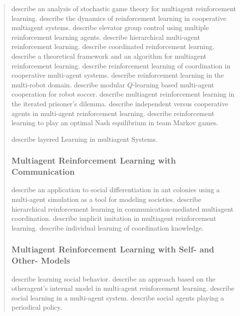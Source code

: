 \begin{quotation}
\cite{bowling2000asg} describe an analysis of stochastic game theory for multiagent reinforcement learning.
\cite{claus1998drl} describe the dynamics of reinforcement learning in cooperative multiagent systems.
\cite{crites1998egc} describe elevator group control using multiple reinforcement learning agents.
\cite{ghavamzadeh2006hma} describe hierarchical multi-agent reinforcement learning.
\cite{guestrin2002crl} describe coordinated reinforcement learning.
\cite{hu1998mrl} describe a theoretical framework and an algorithm for multiagent reinforcement learning.
\cite{kapetanakis2002rlc} describe reinforcement learning of coordination in cooperative multi-agent systems.
\cite{mataric1997rlm} describe reinforcement learning in the multi-robot domain.
\cite{park2001mql} describe modular $Q$-learning based multi-agent cooperation for robot soccer.
\cite{sandholm1996mrl} describe multiagent reinforcement learning in the iterated prisoner's dilemma.
\cite{tan1997mar} describe independent versus cooperative agents in multi-agent reinforcement learning.
\cite{wang2003rlp} describe reinforcement learning to play an optimal Nash equilibrium in team Markov games.

\cite{stone1997llm} describe layered Learning in multiagent Systems.

\subsubsection{Multiagent Reinforcement Learning with Communication}

\cite{drogoul1994mas} describe an application to social differentiation in ant colonies using a multi-agent simulation as a tool for modeling societies.
\cite{fischer2004hrl} describe hierarchical reinforcement learning in communication-mediated multiagent coordination.
\cite{price1999iim} describe implicit imitation in multiagent reinforcement learning.
\cite{sen1998ilc} describe individual learning of coordination knowledge.

\subsubsection{Multiagent Reinforcement Learning with Self- and Other- Models}

\cite{matari1997lsb} describe learning social behavior.
\cite{nagayuki2000mar} describe an approach based on the otheragent's internal model in multi-agent reinforcement learning.
\cite{noble2004slm} describe social learning in a multi-agent system.
\cite{nowe2001sap} describe social agents playing a periodical policy.


\end{quotation}

